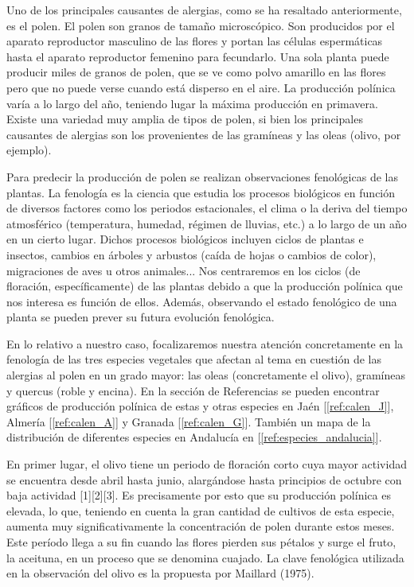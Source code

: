 \documentclass[12pt,oneside,a4paper]{article}
\numberwithin{figure}{section}
\begin{document}
Uno de los principales causantes de alergias, como se ha resaltado anteriormente, es el polen. El polen son granos de tamaño microscópico. Son producidos por el aparato reproductor masculino de las flores y portan las células espermáticas hasta el aparato reproductor femenino para fecundarlo. Una sola planta puede producir miles de granos de polen, que se ve como polvo amarillo en las flores pero que no puede verse cuando está disperso en el aire. La producción polínica varía a lo largo del año, teniendo lugar la máxima producción en primavera. Existe una variedad muy amplia de tipos de polen, si bien los principales causantes de alergias son los provenientes de las gramíneas y las oleas (olivo, por ejemplo).

 
Para predecir la producción de polen se realizan observaciones fenológicas de las plantas. La fenología es la ciencia que estudia los procesos biológicos en función de diversos factores como los periodos estacionales, el clima o la deriva del tiempo atmosférico (temperatura, humedad, régimen de lluvias, etc.) a lo largo de un año en un cierto lugar. Dichos procesos biológicos incluyen ciclos de plantas e insectos, cambios en árboles y arbustos (caída de hojas o cambios de color), migraciones de aves u otros animales... Nos centraremos en los ciclos (de floración, específicamente) de las plantas debido a que la producción polínica que nos interesa es función de ellos. Además, observando el estado fenológico de una planta se pueden prever su futura evolución fenológica.

En lo relativo a nuestro caso, focalizaremos nuestra atención concretamente en la fenología de las tres especies vegetales que afectan al tema en cuestión de las alergias al polen en un grado mayor: las oleas (concretamente el olivo), gramíneas y quercus (roble y encina). En la sección de Referencias se pueden encontrar gráficos de producción polínica de estas y otras especies en Jaén [\ref{ref:calen_J}], Almería [\ref{ref:calen_A}] y Granada [\ref{ref:calen_G}]. También un mapa de la distribución de diferentes especies en Andalucía en [\ref{ref:especies_andalucia}].
 
En primer lugar, el olivo tiene un periodo de floración corto cuya mayor actividad se encuentra desde abril hasta junio, alargándose hasta principios de octubre con baja actividad [1][2][3]. Es precisamente por esto que su producción polínica es elevada, lo que, teniendo en cuenta la gran cantidad de cultivos de esta especie, aumenta muy significativamente la concentración de polen durante estos meses. Este período llega a su fin cuando las flores pierden sus pétalos y surge el fruto, la aceituna, en un proceso que se denomina cuajado. La clave fenológica utilizada en la observación del olivo es la propuesta por Maillard (1975).
\end{document}
